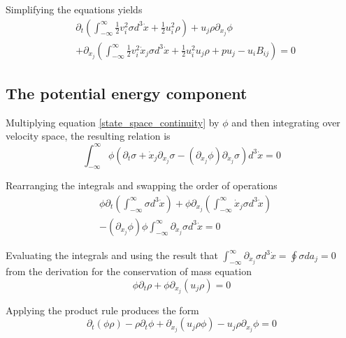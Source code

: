 \documentclass[%
 reprint,
 amsmath,amssymb,
 aps,
]{revtex4-1}
\newcommand{\intVdot}[1]{\int_{-\infty}^{\infty} #1 d^3\dot{x}}
\begin{document}
Simplifying the equations yields
\begin{equation}
\begin{split}
& \partial_t\left(\intVdot{\frac{1}{2}v_i^2\sigma} + \frac{1}{2}u_i^2\rho\right) + u_j\rho\partial_{x_j}\phi \\ & + \partial_{x_j}\left(\intVdot{\frac{1}{2}v_i^2\dot{x}_j\sigma} + \frac{1}{2}u_i^2 u_j\rho + p u_j - u_i B_{ij}\right)=0
\end{split}
\label{incomplete_conservation_of_energy_kinetic}
\end{equation}

\subsection{The potential energy component}
Multiplying equation \eqref{state_space_continuity} by $\phi$ and then integrating over velocity space, the resulting relation is
\[
\intVdot{\phi\left(\partial_t \sigma + \dot{x}_j\partial_{x_j}\sigma-\left(\partial_{x_j}\phi\right)\partial_{\dot{x}_j}\sigma\right)}=0
\]

Rearranging the integrals and swapping the order of operations
\[
\begin{split}
& \phi\partial_t\left(\intVdot{\sigma}\right) + \phi\partial_{x_j}\left(\intVdot{\dot{x}_j\sigma}\right) \\ & - \left(\partial_{x_j}\phi\right)\phi\intVdot{\partial_{\dot{x}_j}\sigma}=0
\end{split}
\]

Evaluating the integrals and using the result that $\intVdot{\partial_{\dot{x}_j}\sigma}=\oint\sigma da_j = 0$ from the derivation for the conservation of mass equation
\[
\phi\partial_t\rho + \phi\partial_{x_j}\left(u_j\rho\right)=0
\]

Applying the product rule produces the form
\begin{equation}
\partial_t\left(\phi\rho\right) - \rho\partial_t\phi + \partial_{x_j}\left(u_j\rho\phi\right) - u_j\rho\partial_{x_j}\phi=0
\label{incomplete_conservation_of_energy_potential}
\end{equation}
\end{document}
